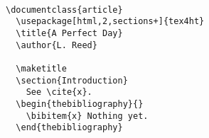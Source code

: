 
\begin{verbatim}
 
\documentclass{article} 
  \usepackage[html,2,sections+]{tex4ht} 
  \title{A Perfect Day} 
  \author{L. Reed} 
 
  \maketitle 
  \section{Introduction}
    See \cite{x}. 
  \begin{thebibliography}{} 
    \bibitem{x} Nothing yet. 
  \end{thebibliography} 
 
  
\end{verbatim}
